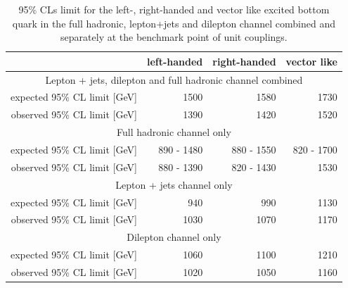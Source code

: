 \begin{table}[hp]
\centering
\begin{tabular}{r||r|r|r}
\hline
&left-handed&right-handed&vector like\\
\hline\hline
\multicolumn{4}{c}{Lepton + jets, dilepton and full hadronic channel combined} \\
\hline
expected 95\% CL limit [GeV] &  1500 & 1580 & 1730 \\
observed 95\% CL limit [GeV] &  1390 & 1420 & 1520 \\
\hline
\multicolumn{4}{c}{Full hadronic channel only} \\
\hline
expected 95\% CL limit [GeV] & 890 - 1480 & 880 - 1550 & 820 - 1700 \\
observed 95\% CL limit [GeV] & 880 - 1390 & 820 - 1430 & 1530 \\
\hline
\multicolumn{4}{c}{Lepton + jets channel only} \\
\hline
expected 95\% CL limit [GeV] & 940  & 990  & 1130 \\
observed 95\% CL limit [GeV] & 1030 & 1070 & 1170 \\
\hline
\multicolumn{4}{c}{Dilepton channel only} \\
\hline
expected 95\% CL limit [GeV] & 1060 & 1100 & 1210 \\
observed 95\% CL limit [GeV] & 1020 & 1050 & 1160 \\
\hline
\end{tabular}
\caption{95\% CLs limit for the left-, right-handed and vector like excited bottom quark in the full hadronic, lepton+jets and dilepton channel combined and separately at the benchmark point of unit couplings.}
\label{limitTable}
\end{table}


